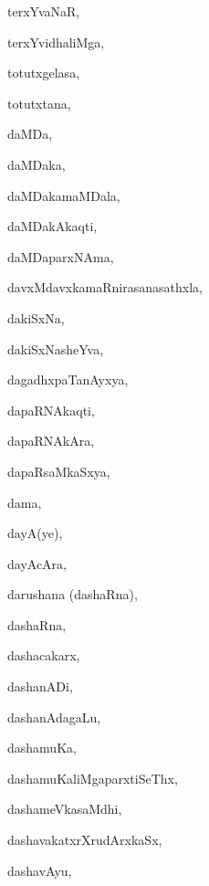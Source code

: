\begin{multicols}{3}
{\noindent
{terxYvaNaR}, \pageref{terxYvaNaR}

\noindent
{terxYvidhaliMga}, \pageref{terxYvidhaliMga}

\noindent
{totutxgelasa}, \pageref{totutxgelasa}

\noindent
{totutxtana}, \pageref{totutxtana}

\noindent
{daMDa}, \pageref{daMDa}

\noindent
{daMDaka}, \pageref{daMDaka}

\noindent
{daMDakamaMDala}, \pageref{daMDakamaMDala}

\noindent
{daMDakAkaqti}, \pageref{daMDakAkaqti}

\noindent
{daMDaparxNAma}, \pageref{daMDaparxNAma}

\noindent
{davxMdavxkamaRnirasanasathxla}, \pageref{davxMdavxkamaRnirasanasathxla}

\noindent
{dakiSxNa}, \pageref{dakiSxNa}

\noindent
{dakiSxNasheYva}, \pageref{dakiSxNasheYva}

\noindent
{dagadhxpaTanAyxya}, \pageref{dagadhxpaTanAyxya}

\noindent
{dapaRNAkaqti}, \pageref{dapaRNAkaqti}

\noindent
{dapaRNAkAra}, \pageref{dapaRNAkAra}

\noindent
{dapaRsaMkaSxya}, \pageref{dapaRsaMkaSxya}

\noindent
{dama}, \pageref{dama}

\noindent
{dayA(ye)}, \pageref{dayAye}

\noindent
{dayAcAra}, \pageref{dayAcAra}

\noindent
{darushana (dashaRna)}, \pageref{darushana dashaRna}

\noindent
{dashaRna}, \pageref{dashaRna}

\noindent
{dashacakarx}, \pageref{dashacakarx}

\noindent
{dashanADi}, \pageref{dashanADi}

\noindent
{dashanAda\-gaLu}, \pageref{dashanAdagaLu}

\noindent
{dashamuKa}, \pageref{dashamuKa}

\noindent
{dashamuKaliMgaparxtiSeThx}, \pageref{dashamuKaliMgaparxtiSeThx}

\noindent
{dashameVkasaMdhi}, \pageref{dashameVkasaMdhi}

\noindent
{dashavakatxrXrudArxkaSx}, \pageref{dashavakatxrXrudArxkaSx}

\noindent
{dashavAyu}, \pageref{dashavAyu}

}
\end{multicols}
